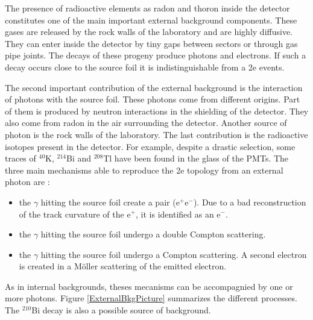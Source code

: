 \documentclass[main.tex]{subfiles}
\begin{document}
\NI The presence of radioactive elements as radon and thoron inside the detector constitutes one of the main important external background components. These gases are released by the rock walls of the laboratory and are highly diffusive. They can enter inside the detector by tiny gaps between sectors or through gas pipe joints. The decays of these progeny produce photons and electrons. If such a decay occurs close to the source foil it is indistinguishable from a 2e events.


\bigskip


\NI The second important contribution of the external background is the interaction of photons with the source foil. These photons come from different origins. Part of them is produced by neutron interactions in the shielding of the detector. They also come from radon in the air surrounding the detector. Another source of photon is the rock walls of the laboratory. The last contribution is the radioactive isotopes present in the detector. For example, despite a drastic selection, some traces of $^{\text{40}}$K, $^{\text{214}}$Bi and $^{\text{208}}$Tl have been found in the glass of the PMTs. The three main mechanisms able to reproduce the 2e topology from an external photon are :   


\begin{itemize}
\item the $\gamma$ hitting the source foil create a pair (e$^+$e$^-$). Due to a bad reconstruction of the track curvature of the e$^+$, it is identified as an e$^-$.
\item the $\gamma$ hitting the source foil undergo a double Compton scattering.
\item the $\gamma$ hitting the source foil undergo a Compton scattering. A second electron is created in a M\"oller scattering of the emitted electron.
\end{itemize} 


\NI As in internal backgrounds, theses mecanisms can be accompagnied by one or more photons. Figure \ref{ExternalBkgPicture}  summarizes the different processes. The $^{\text{210}}$Bi decay is also a possible source of background.
\end{document}
